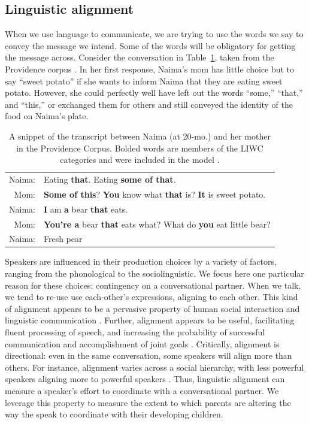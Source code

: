 \documentclass[10pt,letterpaper]{article}
\begin{document}
\subsection{Linguistic alignment}

When we use language to communicate, we are trying to use the words we say to convey the message we intend. Some of the words will be obligatory for getting the message across. Consider the conversation in Table~\ref{tab:naima}, taken from the Providence corpus \cite{demuth2006}. In her first response, Naima's mom has little choice but to say ``sweet potato'' if she wants to inform Naima that they are eating sweet potato. However, she could perfectly well have left out the words ``some,'' ``that,'' and ``this,'' or exchanged them for others and still conveyed the identity of the food on Naima's plate.

\begin{table}[tb]
\begin{tabular}{r p{}}
\hline
Naima: & Eating \textbf{that}. Eating \textbf{some of that}.\\

Mom: & \textbf{Some of this}? \textbf{You} know what \textbf{that} is? \textbf{It} is sweet potato.\\

Naima: & \textbf{I} am \textbf{a} bear \textbf{that} eats.\\

Mom: & \textbf{You're a} bear \textbf{that} eats what? What do \textbf{you} eat little bear?\\

Naima: & Fresh pear\\
\hline
\end{tabular}
\caption{\label{tab:naima}A snippet of the transcript between Naima (at 20-mo.) and her mother in the Providence Corpus. Bolded words are members of the LIWC categories and were included in the model \cite{pennebaker2007}. }
\end{table}

Speakers are influenced in their production choices by a variety of factors, ranging from the phonological to the sociolinguistic. We focus here one particular reason for these choices: contingency on a conversational partner. When we talk, we tend to re-use use each-other's expressions, aligning to each other. This kind of alignment appears to be a pervasive property of human social interaction and linguistic communication \cite{giles1991, garrod2004}. Further, alignment appears to be useful, facilitating fluent processing of speech, and increasing the probability of successful communication and accomplishment of joint goals \cite{ireland2011, fusaroli2012}. Critically, alignment is directional: even in the same conversation, some speakers will align more than others. For instance, alignment varies across a social hierarchy, with less powerful speakers aligning more to powerful speakers \cite{kacewicz2013}. Thus, linguistic alignment can measure a speaker's effort to  coordinate with a conversational partner. We leverage this property to measure the extent to which parents are altering the way the speak to coordinate with their developing children.
\end{document}
